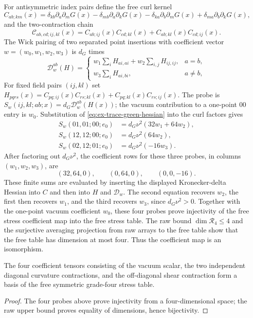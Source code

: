 For antisymmetric index pairs define the free curl kernel
\[
 C_{ab;km}(x)=\delta_{kb}\partial_a\partial_mG(x)
 -\delta_{mb}\partial_a\partial_kG(x)
 -\delta_{ka}\partial_b\partial_mG(x)
 +\delta_{ma}\partial_b\partial_kG(x),
\]
and the two-contraction chain
\[
 \mathcal C_{ab,cd;ij,kl}(x)
 =C_{ab;ij}(x)C_{cd;kl}(x)
  +C_{ab;kl}(x)C_{cd;ij}(x).
\]
The Wick pairing of two separated point insertions with coefficient vector
$w=(w_0,w_1,w_2,w_3)$ is $d_G$ times
\[
 \mathcal D_w^{ab}(H)=
 \begin{cases}
 w_1\sum_i H_{ai,ai}+w_2\sum_{i,j}H_{ij,ij},&a=b,\\
 w_3\sum_i H_{ai,bi},&a\ne b,
 \end{cases}
\]
For fixed field pairs $(ij,kl)$ set
$H_{pqrs}(x)=C_{pq;ij}(x)C_{rs;kl}(x)+C_{pq;kl}(x)C_{rs;ij}(x)$.
The probe is $S_w(ij,kl;ab;x)=d_G\mathcal D_w^{ab}(H(x))$; the vacuum
contribution to a one-point $00$ entry is $w_0$. Substitution of
\eqref{eq:ex-trace-green-hessian} into the curl factors gives
\begin{align}
 S_w(01,01;00;e_0)&=d_G\nu^2(32w_1+64w_2),\\
 S_w(12,12;00;e_0)&=d_G\nu^2(64w_2),\\
 S_w(02,12;01;e_0)&=d_G\nu^2(-16w_3).
 \label{eq:ex-trace-vacuum-probes}
\end{align}
After factoring out $d_G\nu^2$, the coefficient rows for these three
probes, in columns $(w_1,w_2,w_3)$, are
\[
 (32,64,0),\qquad(0,64,0),\qquad(0,0,-16).
\]
These finite sums are evaluated by inserting the displayed Kronecker-delta
Hessian into $C$ and then into $H$ and $\mathcal D_w$. The second equation
recovers $w_2$, the first then recovers $w_1$, and the third recovers $w_3$,
since $d_G\nu^2>0$. Together with the one-point vacuum coefficient $w_0$,
these four probes prove injectivity of the free stress coefficient map into
the free stress table. The raw bound $\dim\mathcal R_4\le4$ and the
surjective averaging projection from raw arrays to the free table show that
the free table has dimension at most four. Thus the coefficient map is an
isomorphism.

\begin{lemma}
\label{lem:ex-trace-free-stress-basis}
The four coefficient tensors consisting of the vacuum scalar, the two
independent diagonal curvature contractions, and the off-diagonal shear
contraction form a basis of the free symmetric grade-four stress table.
\end{lemma}
\begin{proof}
The four probes above prove injectivity from a four-dimensional space; the raw
upper bound proves equality of dimensions, hence bijectivity.
\end{proof}

